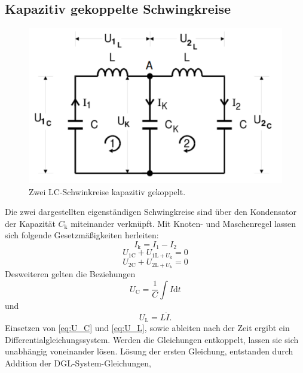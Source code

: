 \subsection{Kapazitiv gekoppelte Schwingkreise}
\begin{figure}[h]
	\centering
	\label{fig:gekoppelte SK}
		\includegraphics[width=\textwidth]{Bilder/2SK.pdf}
		\caption{Zwei LC-Schwinkreise kapazitiv gekoppelt.}
\end{figure}
Die zwei dargestellten eigenständigen Schwingkreise sind über den Kondensator der Kapazität $C_\mathup{k}$ miteinander verknüpft.
 Mit Knoten- und Maschenregel lassen sich folgende Gesetzmäßigkeiten herleiten:
\begin{equation}
	I_\mathup{k}=I_1-I_2
	\label{eq:I_k}
\end{equation}
\begin{equation}
	U_{1\mathup{C}}+U_{1\mathup{L}+U_{\mathup{k}}}=0
	\label{eq:U_1}
\end{equation}
\begin{equation}
	U_{2\mathup{C}}+U_{2\mathup{L}+U_{\mathup{k}}}=0
	\label{eq:U_2}
\end{equation}
Desweiteren gelten die Beziehungen
\begin{equation}
	U_\mathup{C}=\frac{1}{C}\int{I\mathup{d}t}
	\label{eq:U_C}
\end{equation}
und
\begin{equation}
	U_\mathup{L}=L\dot{I}.
	\label{eq:U_L}
\end{equation}
Einsetzen von \eqref{eq:U_C} und \eqref{eq:U_L}, sowie ableiten nach der Zeit ergibt ein Differentialgleichungssystem. 
Werden die Gleichungen entkoppelt, lassen sie sich unabhängig voneinander lösen.
Lösung der ersten Gleichung, entstanden durch Addition der DGL-System-Gleichungen,
